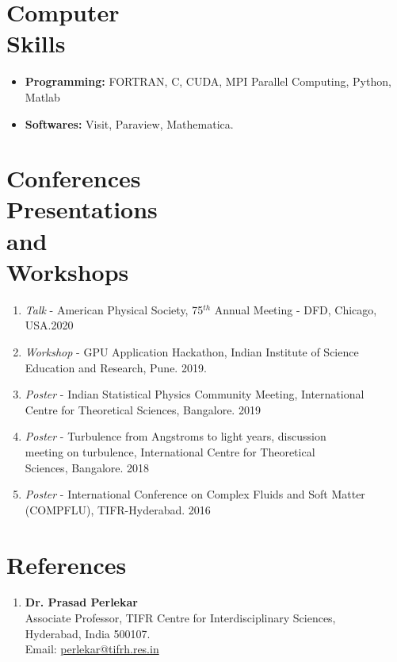 \documentclass[margin]{res}
\begin{document}
\begin{resume}
    \section{Computer \\ Skills}
    \begin{itemize}
        \item {\bf Programming:} FORTRAN, C, CUDA, MPI Parallel Computing,  Python, Matlab
        \item {\bf Softwares:} Visit, Paraview, Mathematica.
    \end{itemize}
    \section{Conferences \\Presentations\\and\\ Workshops}
    \begin{enumerate}
        \item {\it Talk} - American Physical Society, 75$^{th}$ Annual Meeting - DFD, Chicago, \\ USA.\hfill 2020
        \item {\it Workshop} - GPU Application Hackathon, Indian Institute of Science \\ Education and Research, Pune. \hfill  2019.

        \item {\it Poster} - Indian Statistical Physics Community Meeting, International \\ Centre for Theoretical Sciences, Bangalore. \hfill 2019

        \item {\it Poster} - Turbulence from Angstroms to light years, discussion \\ meeting on turbulence, International Centre for Theoretical \\ Sciences, Bangalore. \hfill 2018

        \item {\it Poster} - International Conference on Complex Fluids and Soft Matter \\ (COMPFLU), TIFR-Hyderabad. \hfill 2016
    \end{enumerate} 

\section{References} 
\begin{enumerate}
    \item {\bf Dr. Prasad Perlekar}\\
        Associate Professor, TIFR Centre for Interdisciplinary Sciences,\\ Hyderabad, India 500107. \\
        Email: \href{perlekar@tifrh.res.in}{perlekar@tifrh.res.in}


\end{enumerate}
\end{resume}
\end{document}
